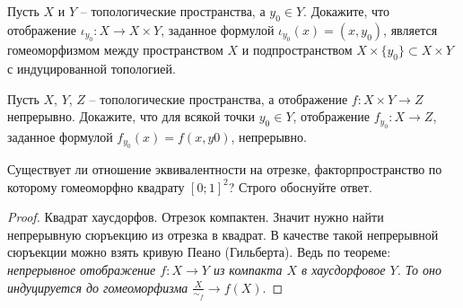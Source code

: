 \documentclass[10pt]{article}
\begin{document}
\tableofcontents
\begin{tasks}
	 \item \begin{tasks}
		\item Пусть $X$ и $Y$ -- топологические пространства, а $y_0 \in Y$. Докажите, что отображение $\iota_{y_0}\colon X\to X \times Y$, заданное формулой $\iota_{y_0}(x)=(x,y_0)$, является гомеоморфизмом между пространством $X$ и подпространством $X\times\{y_0\}\subset X\times Y$ с индуцированной топологией.
		\item Пусть $X$, $Y$, $Z$ -- топологические пространства, а отображение $f\colon X\times Y\to Z$ непрерывно. Докажите, что для всякой точки $y_0 \in Y$, отображение $f_{y_0} \colon X \to Z$, заданное формулой $f_{y_0}(x)=f(x,y0)$, непрерывно.
	\end{tasks}
\end{tasks}
\begin{tasks}[start=3]
	 \item Существует ли отношение эквивалентности на отрезке, факторпространство по которому гомеоморфно квадрату $[0;1]^2$? Строго обоснуйте ответ.
	\begin{proof}
		Квадрат хаусдорфов. Отрезок компактен. Значит нужно найти непрерывную сюръекцию из отрезка в квадрат. В качестве такой непрерывной сюръекции можно взять кривую Пеано (Гильберта). Ведь по теореме: \textit{непрерывное отображение $f\colon X \to Y$ из компакта $X$ в хаусдорфовое $Y$. То оно индуцируется до гомеоморфизма $\frac{X}{\sim_f}\to f(X).$}
	\end{proof}
\end{tasks}
\end{document}
